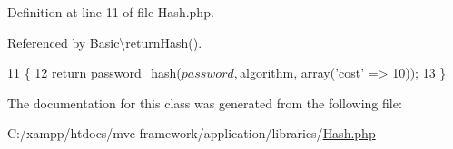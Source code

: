 Definition at line 11 of file Hash.\+php.



Referenced by Basic\textbackslash{}return\+Hash().


\begin{DoxyCode}
11                                                          \{
12         \textcolor{keywordflow}{return} password\_hash($password, $algorithm, array(\textcolor{stringliteral}{'cost'} => 10));
13     \}
\end{DoxyCode}


The documentation for this class was generated from the following file\+:\begin{DoxyCompactItemize}
\item 
C\+:/xampp/htdocs/mvc-\/framework/application/libraries/\hyperlink{_hash_8php}{Hash.\+php}\end{DoxyCompactItemize}
